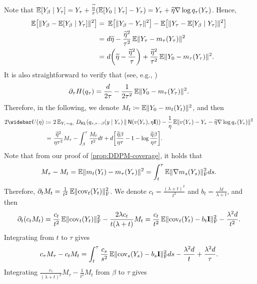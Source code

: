 Note that $\operatorname{\mathbb{E}}[Y_{\beta}\mid Y_\tau]=Y_\tau+\frac{\widetilde{\eta}}{\tau}(\operatorname{\mathbb{E}}[Y_0\mid Y_\tau]-Y_\tau)=Y_\tau+\widetilde{\eta}\nabla \log q_\tau(Y_\tau)$. Hence,
\begin{align*}
    \En\brk*{ \nrm{Y_{\beta}-\En[Y_{\beta}\mid Y_\tau]}^2 }
    =&~\En\brk*{ \nrm{Y_{\beta}-Y_\tau}^2 }-\En\brk*{ \nrm{Y_{\tau}-\En[Y_{\beta}\mid Y_\tau]}^2 } \\
    =&~ d\wt{\eta} - \frac{\wt{\eta}^2}{\tau^2}\En\nrm{Y_\tau-m_\tau(Y_\tau)}^2 \\
    =&~ d\prn*{\wt{\eta}-\frac{\wt{\eta}^2}{\tau}}+\frac{\wt{\eta}^2}{\tau^2}\En\nrm{Y_0-m_\tau(Y_\tau)}^2.
\end{align*}
It is also straightforward to verify that (see, e.g., \citep[Theorem 3.14, I-MMSE]{polyanskiy2025information})
\begin{align*}
    \partial_\tau H(q_\tau)=\frac{d}{2\tau}-\frac{1}{2\tau^2}\operatorname{\mathbb{E}}\lVert Y_0-m_\tau(Y_\tau)\rVert^2.
\end{align*}
Therefore, in the following, we denote $M_t\coloneqq \operatorname{\mathbb{E}}\lVert Y_0-m_t(Y_t)\rVert^2$, and then
\begin{align*}
    2\wb{U}(\eta)\deq &~2\En_{Y_\tau\sim q_\tau}\Dkl{q_{\tau,\tau-\beta}(y\mid Y_\tau)}{\normal{v(Y_\tau),\eta\Id}} -\frac{1}{\eta}\En\nrm{v(Y_\tau)-Y_\tau-\wt{\eta}\nabla \log q_\tau(Y_\tau)}^2 \\
    =&~ \frac{\wt{\eta}^2}{\eta\tau^2}M_\tau-\int_{\beta}^\tau \frac{M_t}{t^2}dt+d\brk*{ \frac{\wt{\eta}\beta}{\eta\tau}-1 -\log\frac{\wt{\eta}\beta}{\eta\tau} }.
\end{align*}
Note that from our proof of \cref{prop:DDPM-coverage}, it holds that
\begin{align*}
    M_\tau-M_t=\operatorname{\mathbb{E}}\lVert m_t(Y_t)-m_\tau(Y_\tau)\rVert^2=\int_t^\tau \operatorname{\mathbb{E}}\lVert\nabla m_s(Y_s)\rVert_{\mathrm{F}}^2 ds.
\end{align*}
Therefore, $\partial_t M_t=\frac{1}{t^2}\operatorname{\mathbb{E}}\lVert\mathrm{cov}_t(Y_t)\rVert_{\mathrm{F}}^2$. We denote $c_t=\frac{(\lambda+t)^2}{t^2}$ and $b_t=\frac{\lambda t}{\lambda+t}$, and then
\begin{align*}
    \partial_t (c_tM_t)=\frac{c_t}{t^2}\operatorname{\mathbb{E}}\lVert\mathrm{cov}_t(Y_t)\rVert_{\mathrm{F}}^2-\frac{2\lambda c_t}{t(\lambda+t)}M_t
    =\frac{c_t}{t^2} \operatorname{\mathbb{E}}\lVert\mathrm{cov}_t(Y_t)-b_t\mathbf{I}\rVert_{\mathrm{F}}^2-\frac{\lambda^2d}{t^2}.
\end{align*}
Integrating from $t$ to $\tau$ gives
\begin{align*}
    c_\tau M_\tau-c_t M_t=\int_t^\tau \frac{c_s}{s^2} \operatorname{\mathbb{E}}\lVert\mathrm{cov}_s(Y_s)-b_s\mathbf{I}\rVert_{\mathrm{F}}^2 ds - \frac{\lambda^2d}{t}+\frac{\lambda^2d}{\tau}.
\end{align*}
Integrating $\frac{c_\tau}{(\lambda+t)^2}M_\tau-\frac{1}{t^2}M_t$ from $\beta$ to $\tau$ gives
